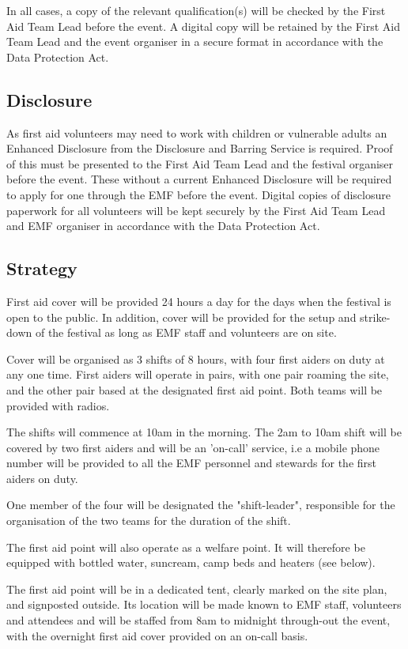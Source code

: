 In all cases, a copy of the relevant qualification(s) will be checked by the
First Aid Team Lead before the event. A digital copy will be retained by the
First Aid Team Lead and the event organiser in a secure format in accordance
with the Data Protection Act.

\subsection{Disclosure}
As first aid volunteers may need to work with children or vulnerable adults an
Enhanced Disclosure from the Disclosure and Barring Service is required. Proof
of this must be presented to the First Aid Team Lead and the festival organiser
before the event. These without a current Enhanced Disclosure will be required
to apply for one through the EMF  before the event. Digital copies of disclosure
paperwork for all volunteers will be kept securely by the First Aid Team Lead and
EMF organiser in accordance with the Data Protection Act.

\subsection{Strategy}
First aid cover will be provided 24 hours a day for the days when the festival
is open to the public. In addition, cover will be provided for the setup and
strike-down of the festival as long as EMF staff and volunteers are on site.

Cover will be organised as 3 shifts of 8 hours, with four first aiders on duty
at any one time. First aiders will operate in pairs, with one pair roaming the
site, and the other pair based at the designated first aid point. Both teams
will be provided with radios.

The shifts will commence at 10am in the morning. The 2am to 10am shift will
be covered by two first aiders and will be an 'on-call’ service, i.e a mobile
phone number will be provided to all the EMF personnel and stewards for the
first aiders on duty.

One member of the four will be designated the "shift-leader", responsible for the organisation of the two teams for the duration of the shift.

The first aid point will also operate as a welfare point. It will therefore be equipped with bottled water, suncream, camp beds and heaters (see below).

The first aid point will be in a dedicated tent, clearly marked on the site plan, and signposted outside. Its location will be made known to EMF staff, volunteers and attendees and will be staffed from 8am to midnight through-out the event, with the overnight first aid cover provided on an on-call basis.

